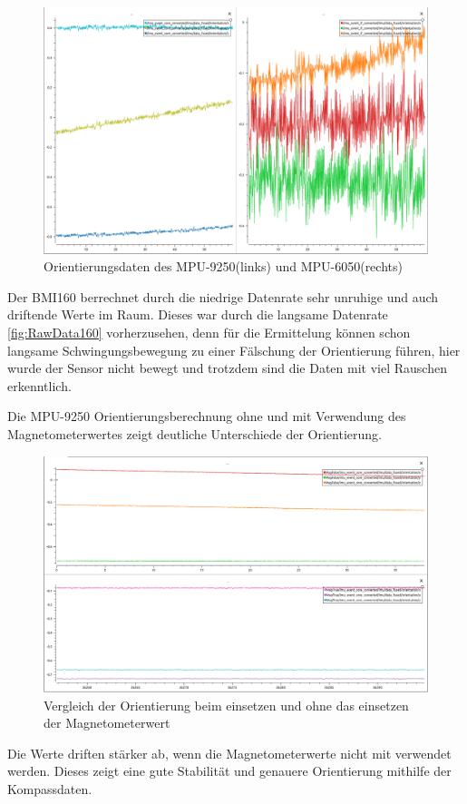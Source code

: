 \newpage
\begin{figure}[h]
	\centering
    \includegraphics[width=1\columnwidth]{Bachelorarbeit/images/160Orientierung.png}
    \caption{Orientierungsdaten des MPU-9250(links) und MPU-6050(rechts)}
    \label{fig:Orientation160}
\end{figure}
Der BMI160 berrechnet durch die niedrige Datenrate sehr unruhige und auch driftende Werte im Raum. Dieses war durch die langsame Datenrate \ref{fig:RawData160} vorherzusehen, denn für die Ermittelung können schon langsame Schwingungsbewegung zu einer Fälschung der Orientierung führen, hier wurde der Sensor nicht bewegt und trotzdem sind die Daten mit viel Rauschen erkenntlich.

\newpage
Die MPU-9250 Orientierungsberechnung ohne und mit Verwendung des Magnetometerwertes zeigt deutliche Unterschiede der Orientierung.

\begin{figure}[h]
	\centering
    \includegraphics[width=1\columnwidth]{Bachelorarbeit/images/ComparisonMagValueSetTrueAndFalse.png}
    \caption{Vergleich der Orientierung beim einsetzen und ohne das einsetzen der Magnetometerwert}
    \label{fig:MagTrueAndFalse}
\end{figure}
Die Werte driften stärker ab, wenn die Magnetometerwerte nicht mit verwendet werden. Dieses zeigt eine gute Stabilität und genauere Orientierung mithilfe der Kompassdaten. 